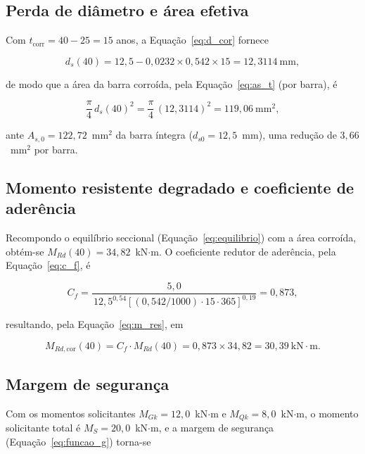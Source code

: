 \begin{appendices}
\subsection{Perda de di\^ametro e \'area efetiva}

Com $t_{\mathrm{corr}} = 40 - 25 = 15$ anos, a Equação~\eqref{eq:d_cor} fornece

\begin{equation}
d_{s}(40) = 12{,}5 - 0{,}0232 \times 0{,}542 \times 15 = 12{,}3114~\text{mm},
\end{equation}

de modo que a área da barra corroída, pela Equação~\eqref{eq:as_t} (por barra), é

\begin{equation}
\frac{\pi}{4}\,d_s(40)^2 = \frac{\pi}{4}\,(12{,}3114)^2 = 119{,}06~\text{mm}^2,
\end{equation}

ante $A_{s,0} = 122{,}72$~mm$^2$ da barra íntegra ($d_{s0} = 12{,}5$~mm), uma redução de $3{,}66$~mm$^2$ por barra.

\subsection{Momento resistente degradado e coeficiente de ader\^encia}

Recompondo o equilíbrio seccional (Equação~\ref{eq:equilibrio}) com a área corroída, obtém-se $M_{Rd}(40) = 34{,}82$~kN$\cdot$m. O coeficiente redutor de aderência, pela Equação~\eqref{eq:c_f}, é

\begin{equation}
C_f = \frac{5{,}0}{\,12{,}5^{0{,}54}\left[(0{,}542/1000)\cdot 15 \cdot 365\right]^{0{,}19}} = 0{,}873,
\end{equation}

resultando, pela Equação~\eqref{eq:m_res}, em

\begin{equation}
M_{Rd,\mathrm{cor}}(40) = C_f \cdot M_{Rd}(40) = 0{,}873 \times 34{,}82 = 30{,}39~\text{kN}\cdot\text{m}.
\end{equation}

\subsection{Margem de seguran\c{c}a}

Com os momentos solicitantes $M_{Gk} = 12{,}0$~kN$\cdot$m e $M_{Qk} = 8{,}0$~kN$\cdot$m, o momento solicitante total é $M_S = 20{,}0$~kN$\cdot$m, e a margem de segurança (Equação~\ref{eq:funcao_g}) torna-se


\end{appendices}
